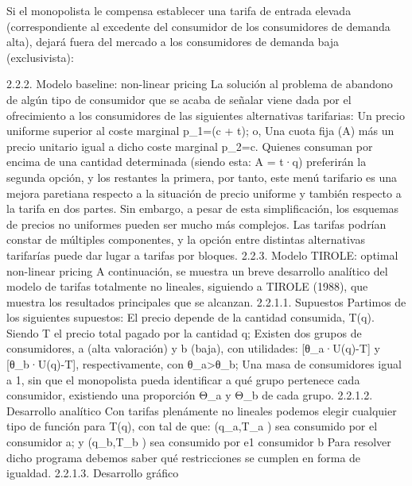 \documentclass[10pt,a4paper]{article}
\begin{document}
Si el monopolista le compensa establecer una tarifa de entrada elevada (correspondiente al excedente del consumidor de los consumidores de demanda alta), dejará fuera del mercado a los consumidores de demanda baja (exclusivista):
 
2.2.2. Modelo baseline: non-linear pricing
La solución al problema de abandono de algún tipo de consumidor que se acaba de señalar viene dada por el ofrecimiento a los consumidores de las siguientes alternativas tarifarias: 
	Un precio uniforme superior al coste marginal p_1=(c + t); o,
	Una cuota fija (A) más un precio unitario igual a dicho coste marginal p_2=c. 
Quienes consuman por encima de una cantidad determinada (siendo esta: A = t·q) preferirán la segunda opción, y los restantes la primera, por tanto, este menú tarifario es una mejora paretiana respecto a la situación de precio uniforme y también respecto a la tarifa en dos partes. Sin embargo, a pesar de esta simplificación, los esquemas de precios no uniformes pueden ser mucho más complejos. Las tarifas podrían constar de múltiples componentes, y la opción entre distintas alternativas tarifarías puede dar lugar a tarifas por bloques. 
2.2.3. Modelo TIROLE: optimal non-linear pricing
A continuación, se muestra un breve desarrollo analítico del modelo de tarifas totalmente no lineales, siguiendo a TIROLE (1988), que muestra los resultados principales que se alcanzan.
2.2.1.1. Supuestos
Partimos de los siguientes supuestos:
	El precio depende de la cantidad consumida, T(q). Siendo T el precio total pagado por la cantidad q;
	Existen dos grupos de consumidores, a (alta valoración) y b (baja), con utilidades: [θ_a·U(q)-T] y [θ_b·U(q)-T], respectivamente, con θ_a>θ_b;
	Una masa de consumidores igual a 1, sin que el monopolista pueda identificar a qué grupo pertenece cada consumidor, existiendo una proporción Θ_a y Θ_b de cada grupo.
2.2.1.2. Desarrollo analítico
Con tarifas plenámente no lineales podemos elegir cualquier tipo de función para T(q), con tal de que: 
	(q_a,T_a ) sea consumido por el consumidor a; y
	(q_b,T_b )  sea consumido por e1 consumidor b
Para resolver dicho programa debemos saber qué restricciones se cumplen en forma de igualdad. 
2.2.1.3. Desarrollo gráfico
  
\end{document}
